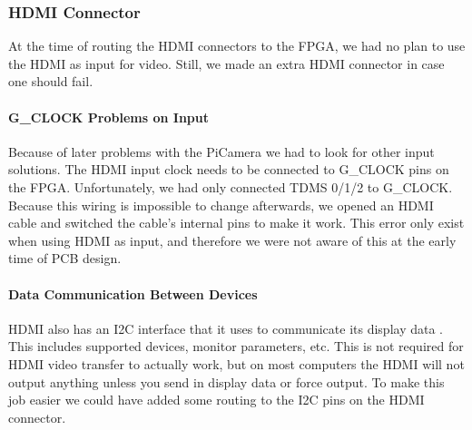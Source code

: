\subsubsection{HDMI Connector}
At the time of routing the HDMI connectors to the FPGA, we had no plan to use the HDMI as input for video.
Still, we made an extra HDMI connector in case one should fail.

\paragraph{G\_CLOCK Problems on Input}
Because of later problems with the PiCamera we had to look for other input solutions.
The HDMI input clock needs to be connected to G\_CLOCK pins on the FPGA.
Unfortunately, we had only connected TDMS 0/1/2 to G\_CLOCK.
Because this wiring is impossible to change afterwards, we opened an HDMI cable and switched the cable's internal pins to make it work.
This error only exist when using HDMI as input, and therefore we were not aware of this at the early time of PCB design.

\paragraph{Data Communication Between Devices}
HDMI also has an I2C interface that it uses to communicate its display data \cite{wikiddc}.
This includes supported devices, monitor parameters, etc.
This is not required for HDMI video transfer to actually work, but on most computers the HDMI will not output anything unless you send in display data or force output.
To make this job easier we could have added some routing to the I2C pins on the HDMI connector.


